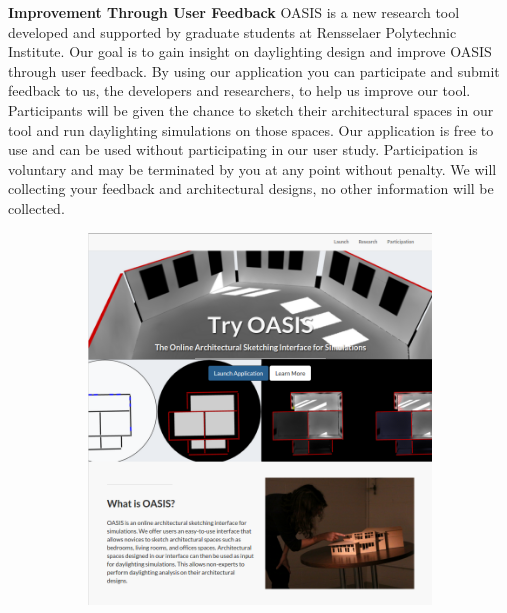 \documentclass[12pt]{article}
\begin{document}
\textbf{Improvement Through User Feedback}
OASIS is a new research tool developed and supported by graduate students at Rensselaer Polytechnic Institute. 
Our goal is to gain insight on daylighting design and improve OASIS through user feedback.
By using our application you can participate and submit feedback to us, the developers and researchers, to help us improve our tool. 
Participants will be given the chance to sketch their architectural spaces in our tool and run daylighting simulations on those spaces. 
Our application is free to use and can be used without participating in our user study. 
Participation is voluntary and may be terminated by you at any point without penalty. 
We will collecting your feedback and architectural designs, no other information will be collected.

\begin{figure}[h]
  \begin{subfigure}{.5\textwidth}
    \centering
    \includegraphics[scale=0.3]{preview}
  \end{subfigure}%
  \begin{subfigure}{.5\textwidth}
    \centering

\end{subfigure}
\end{figure}
\end{document}
